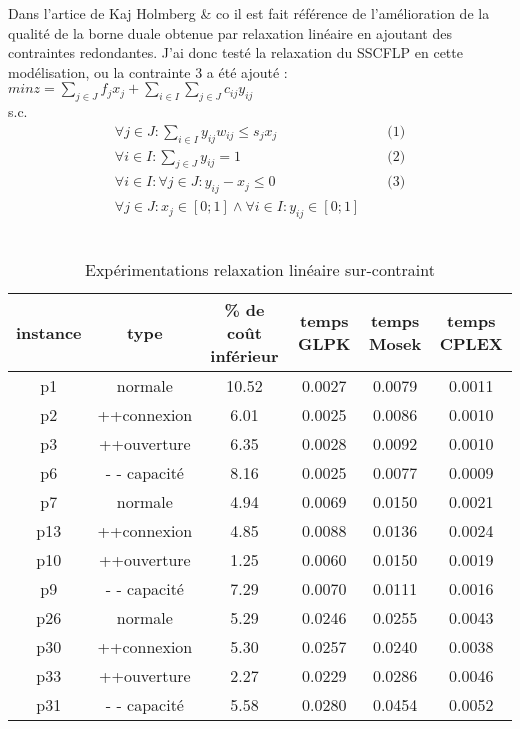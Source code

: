 \documentclass[12pt,a4paper]{article}
\begin{document}
Dans l'artice de Kaj Holmberg \& co il est fait référence de l’amélioration de la qualité de la borne duale obtenue par relaxation linéaire en ajoutant des contraintes redondantes.
J'ai donc testé la relaxation du SSCFLP en cette modélisation, ou la contrainte 3 a été ajouté :\\
$min z = \sum \limits_{j \in J} f_j x_j + \sum \limits_{i \in I} \sum \limits_{j \in J} c_{ij} y_{ij}$\\
s.c.
\begin{align*}
 \forall j \in J : \sum \limits_{i \in I} y_{ij} w_{ij} \leqslant s_j x_j & & \text{ (1)} \\
 \forall i \in I : \sum \limits_{j \in J} y_{ij} = 1 & & \text{ (2)} \\
 \forall i \in I : \forall j \in J : y_{ij} - x_{j} \leqslant 0 & & \text{ (3)} \\
 \forall j \in J : x_j \in \left[ 0;1 \right] \land \forall i \in I : y_{ij} \in \left[ 0;1 \right]
\end{align*}
~\\
\begin{table}[!h]
\centering
\begin{tabular}{|c|c|c|c|c|c|}
  \hline
  instance & type & \% de coût inférieur & temps GLPK & temps Mosek & temps CPLEX \\
  \hline
	p1 & normale & 10.52 & 0.0027 & 0.0079 & 0.0011 \\
	p2 & ++connexion & 6.01 & 0.0025 & 0.0086 & 0.0010 \\
	p3 & ++ouverture &  6.35 & 0.0028 & 0.0092 & 0.0010 \\
	p6 & - - capacité & 8.16 & 0.0025 & 0.0077 & 0.0009 \\
  \hline
	p7 & normale & 4.94 & 0.0069 & 0.0150 & 0.0021 \\
	p13 & ++connexion & 4.85 & 0.0088 & 0.0136 & 0.0024 \\
	p10 & ++ouverture & 1.25 & 0.0060 & 0.0150 & 0.0019 \\
	p9 & - - capacité & 7.29 & 0.0070 & 0.0111 & 0.0016 \\
  \hline	
	p26 & normale & 5.29 & 0.0246 & 0.0255 & 0.0043 \\
	p30 & ++connexion & 5.30 & 0.0257 & 0.0240 & 0.0038 \\
	p33 & ++ouverture & 2.27 & 0.0229 & 0.0286 & 0.0046 \\
	p31 & - - capacité & 5.58 & 0.0280 & 0.0454 & 0.0052 \\
  \hline
\end{tabular}
\caption{Expérimentations relaxation linéaire sur-contraint}
\label{surcontraint}
\end{table}
\end{document}
